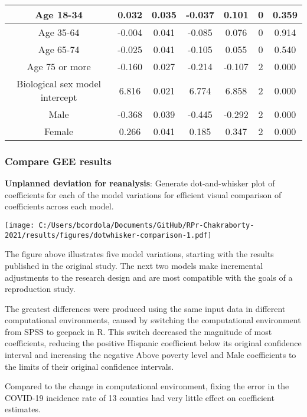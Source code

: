 \documentclass[
]{article}
\begin{document}
\begin{table}
\begin{tabular}[t]{c|c|c|c|c|c|c}
\hline
Age 18-34 & 0.032 & 0.035 & -0.037 & 0.101 & 0 & 0.359\\
\hline
Age 35-64 & -0.004 & 0.041 & -0.085 & 0.076 & 0 & 0.914\\
\hline
Age 65-74 & -0.025 & 0.041 & -0.105 & 0.055 & 0 & 0.540\\
\hline
Age 75 or more & -0.160 & 0.027 & -0.214 & -0.107 & 2 & 0.000\\
\hline
Biological sex model intercept & 6.816 & 0.021 & 6.774 & 6.858 & 2 & 0.000\\
\hline
Male & -0.368 & 0.039 & -0.445 & -0.292 & 2 & 0.000\\
\hline
Female & 0.266 & 0.041 & 0.185 & 0.347 & 2 & 0.000\\
\hline
\end{tabular}
\end{table}

\hypertarget{compare-gee-results}{%
\subsubsection{Compare GEE results}\label{compare-gee-results}}

\textbf{Unplanned deviation for reanalysis}: Generate dot-and-whisker
plot of coefficients for each of the model variations for efficient
visual comparison of coefficients across each model.

\texttt{[image: C:/Users/bcordola/Documents/GitHub/RPr-Chakraborty-2021/results/figures/dotwhisker-comparison-1.pdf]}

The figure above illustrates five model variations, starting with the
results published in the original study. The next two models make
incremental adjustments to the research design and are most compatible
with the goals of a reproduction study.

The greatest differences were produced using the same input data in
different computational environments, caused by switching the
computational environment from SPSS to geepack in R. This switch
decreased the magnitude of most coefficients, reducing the positive
Hispanic coefficient below its original confidence interval and
increasing the negative Above poverty level and Male coefficients to the
limits of their original confidence intervals.

Compared to the change in computational environment, fixing the error in
the COVID-19 incidence rate of 13 counties had very little effect on
coefficient estimates.
\end{document}
